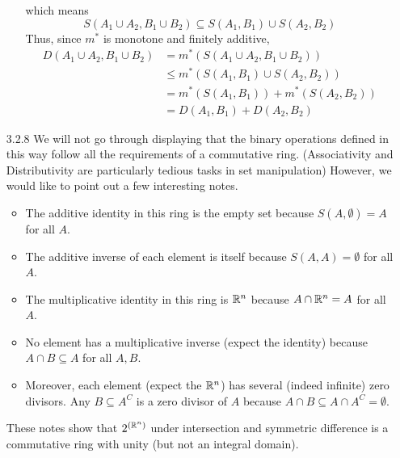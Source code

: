 \documentclass[../../Solutions.tex]{subfiles}
\begin{document}
\begin{itemize}
\begin{enumerate}[(a)]
			which means
			$$ S(A_1\cup A_2,B_1\cup B_2) \subseteq S(A_1,B_1)\cup S(A_2,B_2) $$
			Thus, since $m^*$ is monotone and finitely additive,
			\begin{equation*} \begin{split}
				D(A_1\cup A_2,B_1\cup B_2) & = m^*(S(A_1\cup A_2,B_1\cup B_2)) \\
				& \leq m^*(S(A_1,B_1)\cup S(A_2,B_2)) \\
				& = m^*(S(A_1,B_1))+m^*(S(A_2,B_2)) \\
				& = D(A_1,B_1)+D(A_2,B_2)
			\end{split} \end{equation*}
	\end{enumerate}
	
	\item [3.2.8] We will not go through displaying that the binary operations defined in this way follow all the requirements of a commutative ring.
	(Associativity and Distributivity are particularly tedious tasks in set manipulation)
	However, we would like to point out a few interesting notes.
	\begin{itemize}
		\item The additive identity in this ring is the empty set because $S(A,\emptyset) = A$ for all $A$.
		\item The additive inverse of each element is itself because $S(A,A) = \emptyset$ for all $A$.
		\item The multiplicative identity in this ring is $\mathbb{R}^n$ because $A\cap \mathbb{R}^n = A$ for all $A$.
		\item No element has a multiplicative inverse (expect the identity) because $A\cap B \subseteq A$ for all $A,B$.
		\item Moreover, each element (expect the $\mathbb{R}^n$) has several (indeed infinite) zero divisors.
			Any $B \subseteq A^C$ is a zero divisor of $A$ because $A\cap B \subseteq A\cap A^C = \emptyset$.
	\end{itemize}
	These notes show that $2^{(\mathbb{R}^n)}$ under intersection and symmetric difference is a commutative ring with unity (but not an integral domain).
	

\end{itemize}
\end{document}
